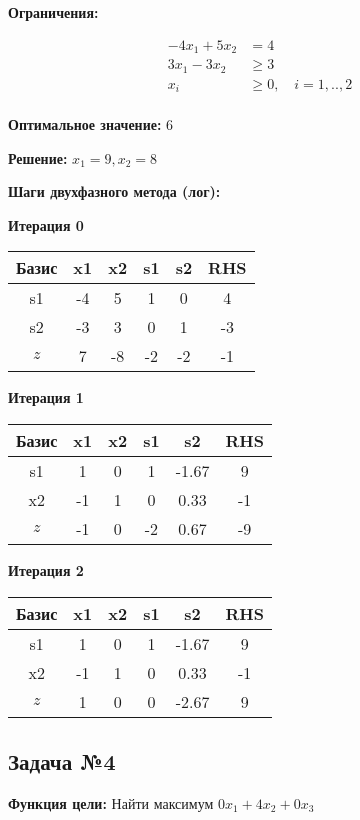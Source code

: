 \documentclass[a4paper,12pt]{article}
\begin{document}
\textbf{Ограничения:}

\[ \begin{aligned}
-4x_{1} +5x_{2} &= 4 \\
3x_{1} -3x_{2} &\ge 3 \\
x_i &\ge 0,\quad i=1,..,2\\
\end{aligned}\]

\textbf{Оптимальное значение: }$6$

\textbf{Решение: }$x_{1}=9, x_{2}=8$

\textbf{Шаги двухфазного метода (лог):}


 \textbf{Итерация 0}\\
\begin{tabular}{|c|c|c|c|c|c|}
\hline
Базис & x1 & x2 & s1 & s2 & RHS \\ \hline
s1 & -4 & 5 & 1 & 0 & 4 \\ \hline
s2 & -3 & 3 & 0 & 1 & -3 \\ \hline
$z$ & 7 & -8 & -2 & -2 & -1 \\ \hline
\end{tabular}
\vspace{5mm}

 \textbf{Итерация 1}\\
\begin{tabular}{|c|c|c|c|c|c|}
\hline
Базис & x1 & x2 & s1 & s2 & RHS \\ \hline
s1 & 1 & 0 & 1 & -1.67 & 9 \\ \hline
x2 & -1 & 1 & 0 & 0.33 & -1 \\ \hline
$z$ & -1 & 0 & -2 & 0.67 & -9 \\ \hline
\end{tabular}
\vspace{5mm}

 \textbf{Итерация 2}\\
\begin{tabular}{|c|c|c|c|c|c|}
\hline
Базис & x1 & x2 & s1 & s2 & RHS \\ \hline
s1 & 1 & 0 & 1 & -1.67 & 9 \\ \hline
x2 & -1 & 1 & 0 & 0.33 & -1 \\ \hline
$z$ & 1 & 0 & 0 & -2.67 & 9 \\ \hline
\end{tabular}
\vspace{5mm}



\subsection*{Задача №4}
\textbf{Функция цели: }
Найти максимум $ 0x_{1} +4x_{2} +0x_{3} $\\
\end{document}
